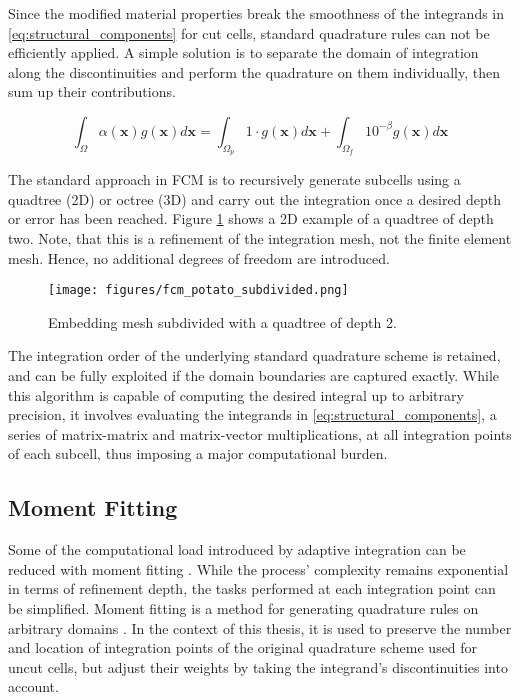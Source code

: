 Since the modified material properties break the smoothness of the integrands in \ref{eq:structural_components} for cut cells, standard quadrature rules can not be efficiently applied. A simple solution is to separate the domain of integration along the discontinuities and perform the quadrature on them individually, then sum up their contributions.

\begin{equation}
	\int_{\Omega} \alpha (\mathbf x) g(\mathbf x) d\mathbf x=
	\int_{\Omega_p} 1 \cdot g(\mathbf x) d\mathbf x
	+
	\int_{\Omega_f} 10^{-\beta} g(\mathbf x) d\mathbf x
\end{equation}

 The standard approach in FCM is to recursively generate subcells using a quadtree (2D) or octree (3D) and carry out the integration once a desired depth or error has been reached. Figure \ref{fig:fcm_potato_partitioned} shows a 2D example of a quadtree of depth two. Note, that this is a refinement of the integration mesh, not the finite element mesh. Hence, no additional degrees of freedom are introduced.

\begin{figure}[h]
	\centering
	\texttt{[image: figures/fcm\_potato\_subdivided.png]}
	\caption{Embedding mesh subdivided with a quadtree of depth 2.}
	\label{fig:fcm_potato_partitioned}
\end{figure}

The integration order of the underlying standard quadrature scheme is retained, and can be fully exploited if the domain boundaries are captured exactly. While this algorithm is capable of computing the desired integral up to arbitrary precision, it involves evaluating the integrands in \ref{eq:structural_components}, a series of matrix-matrix and matrix-vector multiplications, at all integration points of each subcell, thus imposing a major computational burden.

\subsection*{Moment Fitting}
\label{subsection:moment_fitting}

Some of the computational load introduced by adaptive integration can be reduced
with moment fitting \cite{Joulaian2015}. While the process' complexity remains exponential in terms of refinement depth, the tasks performed at each integration point can be simplified. Moment fitting is a method for generating quadrature rules on arbitrary domains \cite{Muller2013}. In the context of this thesis, it is used to preserve the number and location of integration points of the original quadrature scheme used for uncut cells, but adjust their weights by taking the integrand's discontinuities into account.

